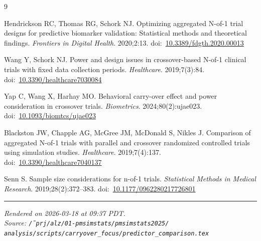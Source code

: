 \documentclass[11pt]{article}
\begin{document}
\begingroup
\renewcommand{\section}[2]{}
\begin{thebibliography}{9}

Hendrickson RC, Thomas RG, Schork NJ.
Optimizing aggregated N-of-1 trial designs for predictive biomarker
validation: Statistical methods and theoretical findings.
\textit{Frontiers in Digital Health}. 2020;2:13.
doi:~\href{https://doi.org/10.3389/fdgth.2020.00013}%
  {10.3389/fdgth.2020.00013}

Wang Y, Schork NJ.
Power and design issues in crossover-based N-of-1 clinical trials with
fixed data collection periods.
\textit{Healthcare}. 2019;7(3):84.
doi:~\href{https://doi.org/10.3390/healthcare7030084}%
  {10.3390/healthcare7030084}

Yap C, Wang X, Harhay MO.
Behavioral carry-over effect and power consideration in crossover
trials.
\textit{Biometrics}. 2024;80(2):ujae023.
doi:~\href{https://doi.org/10.1093/biomtcs/ujae023}%
  {10.1093/biomtcs/ujae023}

Blackston JW, Chapple AG, McGree JM, McDonald S, Nikles J.
Comparison of aggregated N-of-1 trials with parallel and crossover
randomized controlled trials using simulation studies.
\textit{Healthcare}. 2019;7(4):137.
doi:~\href{https://doi.org/10.3390/healthcare7040137}%
  {10.3390/healthcare7040137}

Senn S.
Sample size considerations for n-of-1 trials.
\textit{Statistical Methods in Medical Research}. 2019;28(2):372--383.
doi:~\href{https://doi.org/10.1177/0962280217726801}%
  {10.1177/0962280217726801}

\end{thebibliography}
\endgroup

\bigskip
\hrule
\medskip
{\small\itshape
  Rendered on 2026-03-18 at 09:37 PDT.\\
  Source: \texttt{\~/prj/alz/01-pmsimstats/pmsimstats2025/%
    analysis/scripts/carryover\_focus/predictor\_comparison.tex}
}
\end{document}
